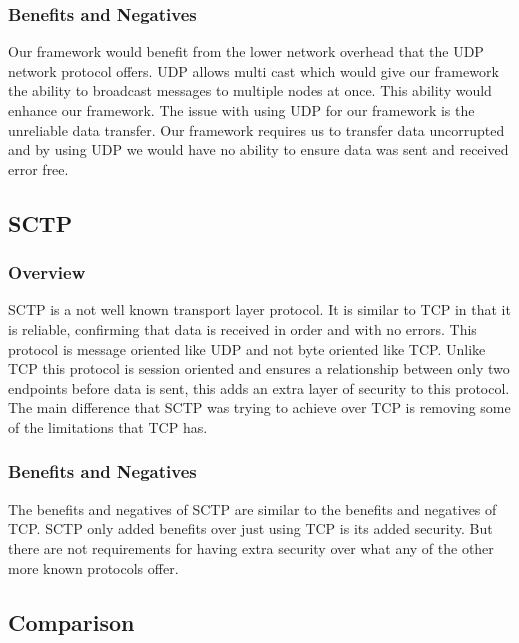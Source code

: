 \subsubsection{Benefits and Negatives}
Our framework would benefit from the lower network overhead that the UDP network protocol offers. UDP allows multi cast which would give our framework the ability to broadcast messages to multiple nodes at once. This ability would enhance our framework. The issue with using UDP for our framework is the unreliable data transfer. Our framework requires us to transfer data uncorrupted and by using UDP we would have no ability to ensure data was sent and received error free.

\subsection{SCTP}
\subsubsection{Overview}
SCTP is a not well known transport layer protocol. It is similar to TCP in that it is reliable, confirming that data is received in order and with no errors. This protocol is message oriented like UDP and not byte oriented like TCP. Unlike TCP this protocol is session oriented and ensures a relationship between only two endpoints before data is sent, this adds an extra layer of security to this protocol. The main difference that SCTP was trying to achieve over TCP is removing some of the limitations that TCP has. \cite{realtime}

\subsubsection{Benefits and Negatives}
The benefits and negatives of SCTP are similar to the benefits and negatives of TCP. SCTP only added benefits over just using TCP is its added security. But there are not requirements for having extra security over what any of the other more known protocols offer.

\subsection{Comparison}

